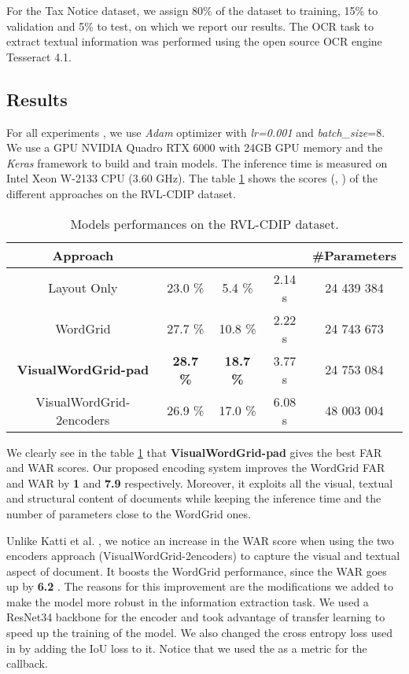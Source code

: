 \documentclass[runningheads]{llncs}
\begin{document}
For the Tax Notice dataset, we assign 80\% of the dataset to training, 15\% to validation and 5\% to test, on which we report our results.  The OCR task to extract textual information was performed using the open source OCR engine Tesseract 4.1.


 \subsection{Results}
For all experiments , we use \textit{Adam} optimizer with \textit{lr=0.001} and \textit{batch\_size}=8. We use a GPU NVIDIA Quadro RTX 6000 with 24GB GPU memory and the  \textit{Keras} framework \cite{keras} to build and train models. The inference time is measured on  Intel Xeon W-2133 CPU (3.60 GHz).  The table \ref{tab1} shows the scores (, ) of the different approaches on the RVL-CDIP dataset.\\

\begin{table}[!htbp] 
\label{tab:schemes} 
\caption{Models performances on the RVL-CDIP dataset.}
\label{tab1}
\centering 
\renewcommand{\arraystretch}{1.5} 
\begin{tabular}{|c|c|c|c|c|}
\hline
 Approach &  &   &  & \#Parameters   \\
\hline

Layout Only  & 23.0 \%   &   5.4 \% & 2.14 s & 24 439 384\\
\hline
WordGrid  & 27.7 \%   &  10.8 \% & 2.22 s  &  24 743 673 \\
\hline
\textbf{VisualWordGrid-pad}  & \textbf{28.7 \%}   &  \textbf{18.7 \%} &
3.77 s & 
24 753 084\\
\hline
VisualWordGrid-2encoders  & 26.9 \%   &  17.0 \% & 
6.08 s & 48 003 004\\

\hline
\end{tabular}
\end{table}


We clearly see in the table \ref{tab1} that \textbf{VisualWordGrid-pad} gives the best FAR and WAR scores. Our proposed encoding system improves the WordGrid FAR and WAR by \textbf{1 } and  \textbf{7.9 } respectively. Moreover, it exploits all the visual, textual and structural content of documents while keeping the inference time and  the number of  parameters close to the WordGrid ones. 

Unlike Katti et al. \cite{chargrid}, we notice an increase in the WAR score when using the two encoders approach (VisualWordGrid-2encoders)  to capture the visual and textual aspect of document. It boosts the WordGrid performance, since the WAR goes up by \textbf{6.2 }.
The reasons for this improvement are the modifications we added to make the model  more robust in the information extraction task. We used a ResNet34 backbone for the encoder and took advantage of transfer learning to speed up the training of the model. We also changed the cross entropy loss used in \cite{chargrid} by adding the  IoU loss to it. Notice that we  used the  as a metric for the callback. 
\end{document}
